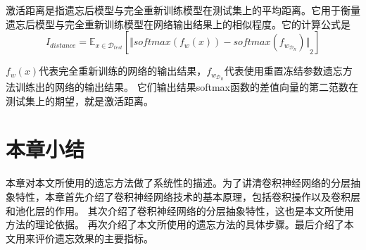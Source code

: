 激活距离是指遗忘后模型与完全重新训练模型在测试集上的平均距离。它用于衡量遗忘后模型与完全重新训练模型在网络输出结果上的相似程度。它的计算公式是
\begin{equation}
I_{distance} = {\mathbb{E}}_{x\in {\mathcal{D}_{test}}}[{\Vert softmax(f_w(x)) - softmax(f_{w_{\mathcal{D}_R}}) \Vert}_2 ] \label{index_distance}
\end{equation}

$f_w(x)$代表完全重新训练的网络的输出结果，$f_{w_{\mathcal{D}_R}}$代表使用重置冻结参数遗忘方法训练出的网络的输出结果。
它们输出结果softmax函数的差值向量的第二范数在测试集上的期望，就是激活距离。


\section{本章小结}
本章对本文所使用的遗忘方法做了系统性的描述。为了讲清卷积神经网络的分层抽象特性，本章首先介绍了卷积神经网络技术的基本原理，包括卷积操作以及卷积层和池化层的作用。
其次介绍了卷积神经网络的分层抽象特性，这也是本文所使用方法的理论依据。
再次介绍了本文所使用的遗忘方法的具体步骤。最后介绍了本文用来评价遗忘效果的主要指标。
